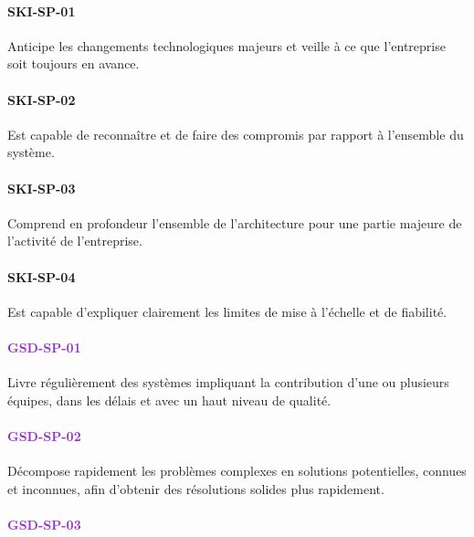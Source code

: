 \documentclass[a4paper, french, openany, 12pt]{book}
\newcommand\dex[1]{\textcolor{BrickRed}{\textbf{\uppercase{ski-{#1}}}}}
\newcommand\str[1]{\textcolor{DarkOrchid}{\textbf{\uppercase{gsd-{#1}}}}}
\begin{document}
\begin{multicols}{2}

  \paragraph*{\dex{sp-01}}

  Anticipe les changements technologiques majeurs et veille à ce que l'entreprise soit toujours en avance.

  \paragraph*{\dex{sp-02}}

  Est capable de reconnaître et de faire des compromis par rapport à l'ensemble du système.
  
  \paragraph*{\dex{sp-03}}

  Comprend en profondeur l'ensemble de l'architecture pour une partie majeure de l'activité de l'entreprise.
  
  \paragraph*{\dex{sp-04}}

  Est capable d'expliquer clairement les limites de mise à l'échelle et de fiabilité.

  \paragraph*{\str{sp-01}}

  Livre régulièrement des systèmes impliquant la contribution d'une ou plusieurs équipes, dans les délais et avec un haut 
  niveau de qualité.

  \paragraph*{\str{sp-02}}

  Décompose rapidement les problèmes complexes en solutions potentielles, connues et inconnues, afin d'obtenir des 
  résolutions solides plus rapidement.

  \paragraph*{\str{sp-03}}


\end{multicols}
\end{document}
